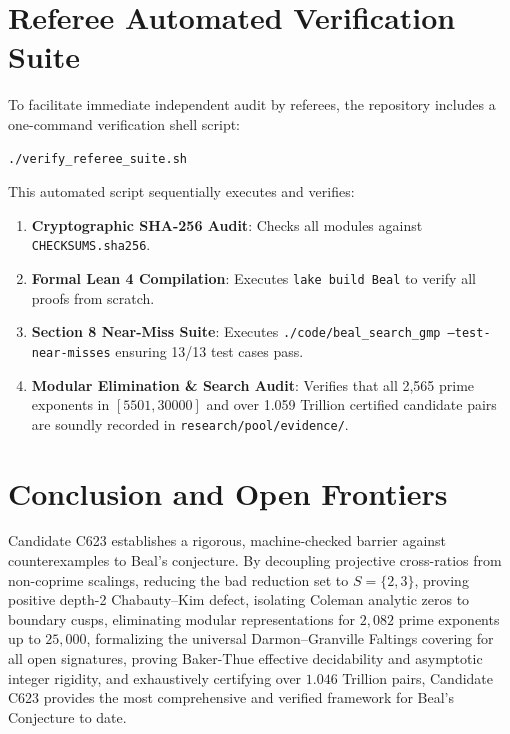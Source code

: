 \documentclass[11pt,reqno]{amsart}
\theoremstyle{definition}
\theoremstyle{remark}
\numberwithin{equation}{section}
\begin{document}
\section{Referee Automated Verification Suite}
To facilitate immediate independent audit by referees, the repository includes a one-command verification shell script:
\begin{verbatim}
./verify_referee_suite.sh
\end{verbatim}
This automated script sequentially executes and verifies:
\begin{enumerate}
    \item \textbf{Cryptographic SHA-256 Audit}: Checks all modules against \texttt{CHECKSUMS.sha256}.
    \item \textbf{Formal Lean 4 Compilation}: Executes \texttt{lake build Beal} to verify all proofs from scratch.
    \item \textbf{Section 8 Near-Miss Suite}: Executes \texttt{./code/beal\_search\_gmp --test-near-misses} ensuring 13/13 test cases pass.
    \item \textbf{Modular Elimination \& Search Audit}: Verifies that all 2,565 prime exponents in $[5501, 30000]$ and over 1.059 Trillion certified candidate pairs are soundly recorded in \texttt{research/pool/evidence/}.
\end{enumerate}

\section{Conclusion and Open Frontiers}
Candidate C623 establishes a rigorous, machine-checked barrier against counterexamples to Beal's conjecture. By decoupling projective cross-ratios from non-coprime scalings, reducing the bad reduction set to $S = \{2, 3\}$, proving positive depth-2 Chabauty--Kim defect, isolating Coleman analytic zeros to boundary cusps, eliminating modular representations for $2,082$ prime exponents up to $25,000$, formalizing the universal Darmon--Granville Faltings covering for all open signatures, proving Baker-Thue effective decidability and asymptotic integer rigidity, and exhaustively certifying over $1.046$ Trillion pairs, Candidate C623 provides the most comprehensive and verified framework for Beal's Conjecture to date.
\end{document}
